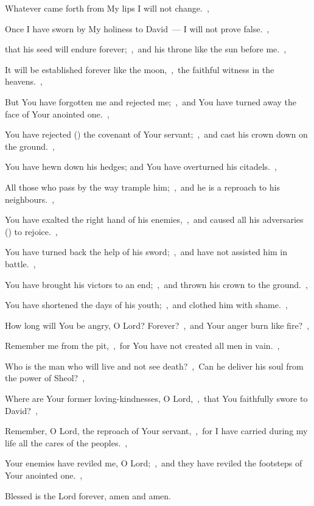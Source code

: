 \documentclass[12pt,twoside,a5paper]{article}
\begin{document}
\begin{halfparskip}
  Whatever came forth from My lips I will not change.~\sep

  Once I have sworn by My holiness to David~--- I will not prove false.~\sep

  that his seed will endure forever;~\sep\ and his throne like the sun before me.~\sep

  It will be established forever like the moon,~\sep\ the faithful witness in the heavens.~\sep

  But You have forgotten me and rejected me;~\sep\ and You have turned away the face of Your anointed one.~\sep

  You have rejected () the covenant of Your servant;~\sep\ and cast his crown down on the ground.~\sep

  You have hewn down his hedges; and You have overturned his citadels.~\sep

  All those who pass by the way trample him;~\sep\ and he is a reproach to his neighbours.~\sep

  You have exalted the right hand of his enemies,~\sep\ and caused all his adversaries () to rejoice.~\sep

  You have turned back the help of his sword;~\sep\ and have not assisted him in battle.~\sep

  You have brought his victors to an end;~\sep\ and thrown his crown to the ground.~\sep

  You have shortened the days of his youth;~\sep\ and clothed him with shame.~\sep

  How long will You be angry, O Lord? Forever?~\sep\ and Your anger burn like fire?~\sep

  Remember me from the pit,~\sep\ for You have not created all men in vain.~\sep

  Who is the man who will live and not see death?~\sep\ Can he deliver his soul from the power of Sheol?~\sep

  Where are Your former loving-kindnesses, O Lord,~\sep\ that You faithfully swore to David?~\sep

  Remember, O Lord, the reproach of Your servant,~\sep\ for I have carried during my life all the cares of the peoples.~\sep

  Your enemies have reviled me, O Lord;~\sep\ and they have reviled the footsteps of Your anointed one.~\sep

  Blessed is the Lord forever, amen and amen.
\end{halfparskip}
\end{document}
